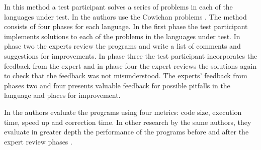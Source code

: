 In this method a test participant solves a series of problems in each of the languages under test. In \cite{nanz2013examining} the authors use the Cowichan problems \cite{wilson1995assessing}. The method consists of four phases for each language. In the first phase the test participant implements solutions to each of the problems in the languages under test. In phase two the experts review the programs and write a list of comments and suggestions for improvements. In phase three the test participant incorporates the feedback from the expert and in phase four the expert reviews the solutions again to check that the feedback was not misunderstood. The experts' feedback from phases two and four presents valuable feedback for possible pitfalls in the language and places for improvement.

In \cite{nanz2013examining} the authors evaluate the programs using four metrics: code size, execution time, speed up and correction time. In other research by the same authors, they evaluate in greater depth the performance of the programs before and after the expert review phases \cite{nanz2013benchmarking}.